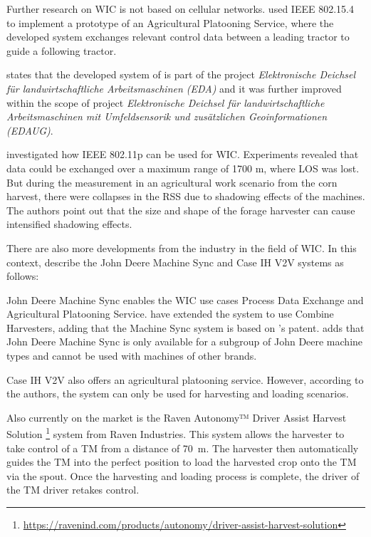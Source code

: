 Further research on \ac{WIC} is not based on cellular networks. \textcite{zhang_method_2009} used IEEE 802.15.4 to implement a
prototype of an Agricultural Platooning Service, where the developed system exchanges relevant control data between a leading tractor
to guide a following tractor.

\textcite{smolnik_5g_2020} states that the developed system of \textcite{zhang_method_2009} is part
of the project \textit{Elektronische Deichsel für landwirtschaftliche Arbeitsmaschinen (EDA)}
and it was further improved within the scope of project \textit{Elektronische Deichsel für landwirtschaftliche Arbeitsmaschinen mit Umfeldsensorik und zusätzlichen Geoinformationen (EDAUG)}.


\textcite{klingler_agriculture_2018} investigated how IEEE 802.11p can be used for \ac{WIC}. Experiments revealed
that data could be exchanged over a maximum range of 1700 m, where \ac{LOS} was lost. But during the
measurement in an agricultural work scenario from the corn harvest, there were collapses in the \ac{RSS}
due to shadowing effects of the machines. The authors point out that the size and shape of the forage harvester
can cause intensified shadowing effects.

There are also more developments from the industry in the field of \ac{WIC}. In this context, \textcite{thomasson_review_2018} describe the John Deere Machine Sync and Case IH V2V systems as follows:

John Deere Machine Sync enables the \ac{WIC} use cases Process Data Exchange and Agricultural Platooning Service. \textcite{liu_automation_2022} have extended the system to use Combine Harvesters, adding that the Machine Sync system is based on \textcite{metzler_system_2006}'s patent.
\textcite{smolnik_5g_2020} adds that John Deere Machine Sync is only available for a subgroup of John Deere machine types and cannot be used with machines of other brands.

Case IH V2V also offers an agricultural platooning service. However, according to the authors, the system can only be used for harvesting and loading scenarios.

Also currently on the market is the Raven Autonomy™ Driver Assist Harvest Solution \footnote{\url{https://ravenind.com/products/autonomy/driver-assist-harvest-solution}} system from Raven Industries. This system allows the harvester to take control of a \ac{TM} from a distance of \SI{70}{\metre}. The harvester then automatically guides the \ac{TM} into the perfect position to load the harvested crop onto the \ac{TM} via the spout. Once the harvesting and loading process is complete, the driver of the \ac{TM} driver retakes control.

